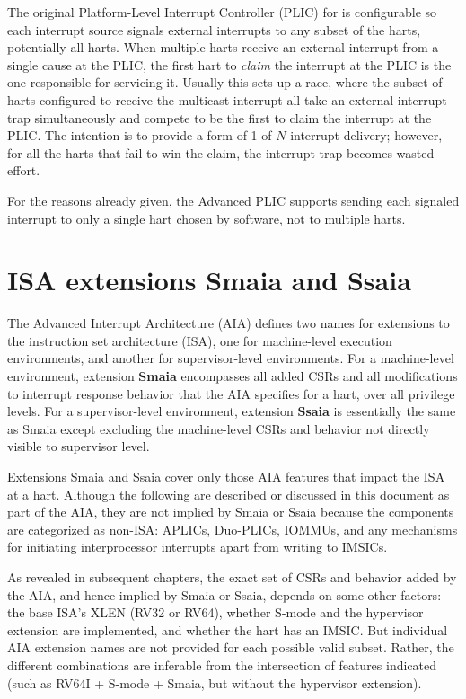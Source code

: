 \begin{commentary}
The original Platform-Level Interrupt Controller (PLIC) for {\RISCV}
is configurable so each interrupt source signals external interrupts to
any subset of the harts, potentially all harts.
When multiple harts receive an external interrupt from a single cause
at the PLIC, the first hart to \emph{claim} the interrupt at the PLIC
is the one responsible for servicing it.
Usually this sets up a race, where the subset of harts configured to
receive the multicast interrupt all take an external interrupt trap
simultaneously and compete to be the first to claim the interrupt at
the PLIC.
The intention is to provide a form of \mbox{1-of-$N$} interrupt
delivery;
however, for all the harts that fail to win the claim, the interrupt
trap becomes wasted effort.

For the reasons already given, the Advanced PLIC supports sending each
signaled interrupt to only a single hart chosen by software, not to
multiple harts.
\end{commentary}

\section{ISA extensions Smaia and Ssaia}

The Advanced Interrupt Architecture (AIA) defines two names for
extensions to the {\RISCV} instruction set architecture (ISA),
one for machine-level execution environments,
and another for supervisor-level environments.
For a machine-level environment, extension \textbf{Smaia} encompasses
all added CSRs and all modifications to interrupt response behavior
that the AIA specifies for a hart, over all privilege levels.
For a supervisor-level environment, extension \textbf{Ssaia} is
essentially the same as Smaia except excluding the machine-level
CSRs and behavior not directly visible to supervisor level.

Extensions Smaia and Ssaia cover only
those AIA features that impact the ISA at a hart.
Although the following are described or discussed
in this document as part of the AIA, they are not implied by
Smaia or Ssaia because the components are categorized as non-ISA:
APLICs, Duo-PLICs, IOMMUs, and any mechanisms for initiating
interprocessor interrupts apart from writing to IMSICs.

As revealed in subsequent chapters, the exact set
of CSRs and behavior added by the AIA, and hence
implied by Smaia or Ssaia, depends on some other factors:
the base ISA's XLEN (RV32 or RV64), whether \mbox{S-mode}
and the hypervisor extension are implemented,
and whether the hart has an IMSIC.
But individual AIA extension names are not
provided for each possible valid subset.
Rather, the different combinations are inferable
from the intersection of features indicated (such as
RV64I + \mbox{S-mode} + Smaia, but without the hypervisor extension).

